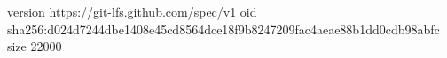 version https://git-lfs.github.com/spec/v1
oid sha256:d024d7244dbe1408e45cd8564dce18f9b8247209fac4aeae88b1dd0cdb98abfc
size 22000
